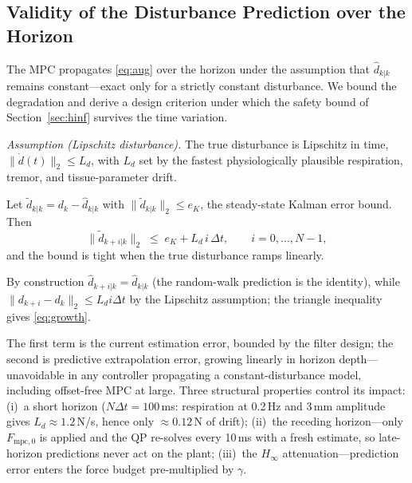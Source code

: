 \subsection{Validity of the Disturbance Prediction over the Horizon}\label{sec:validity}

The MPC propagates \eqref{eq:aug} over the horizon under the assumption that $\hat{d}_{k|k}$ remains constant---exact only for a strictly constant disturbance. We bound the degradation and derive a design criterion under which the safety bound of Section~\ref{sec:hinf} survives the time variation.

\emph{Assumption (Lipschitz disturbance).} The true disturbance is Lipschitz in time, $\|\dot{d}(t)\|_2 \le L_d$, with $L_d$ set by the fastest physiologically plausible respiration, tremor, and tissue-parameter drift.

\begin{lemma}\label{lem:growth}
Let $\tilde{d}_{k|k} = d_k - \hat{d}_{k|k}$ with $\|\tilde{d}_{k|k}\|_2 \le e_K$, the steady-state Kalman error bound. Then
\begin{equation}
\|\tilde{d}_{k+i|k}\|_2 \;\le\; e_K + L_d\, i\, \Delta t, \qquad i = 0, \dots, N{-}1,
\label{eq:growth}
\end{equation}
and the bound is tight when the true disturbance ramps linearly.
\end{lemma}

\begin{IEEEproof}
By construction $\hat{d}_{k+i|k} = \hat{d}_{k|k}$ (the random-walk prediction is the identity), while $\|d_{k+i} - d_k\|_2 \le L_d i \Delta t$ by the Lipschitz assumption; the triangle inequality gives \eqref{eq:growth}.
\end{IEEEproof}

The first term is the current estimation error, bounded by the filter design; the second is predictive extrapolation error, growing linearly in horizon depth---unavoidable in any controller propagating a constant-disturbance model, including offset-free MPC at large. Three structural properties control its impact: (i)~a short horizon ($N\Delta t = 100$\,ms: respiration at 0.2\,Hz and 3\,mm amplitude gives $L_d \approx 1.2$\,N/s, hence only ${\approx}0.12$\,N of drift); (ii)~the receding horizon---only $F_{\text{mpc},0}$ is applied and the QP re-solves every 10\,ms with a fresh estimate, so late-horizon predictions never act on the plant; (iii)~the $H_\infty$ attenuation---prediction error enters the force budget pre-multiplied by $\gamma$.

